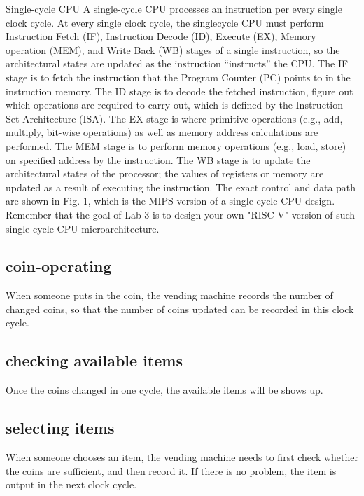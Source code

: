 \documentclass[12pt,a4paper]{article}
\begin{document}
Single-cycle CPU 
A single-cycle CPU processes an instruction per every single clock cycle. 
At every single clock cycle, the singlecycle CPU must perform Instruction Fetch (IF), Instruction Decode (ID), Execute (EX), Memory operation (MEM), and Write Back (WB) stages of a single instruction, so the architectural states are updated as the instruction “instructs” the CPU. 
The IF stage is to fetch the instruction that the Program Counter (PC) points to in the instruction memory. 
The ID stage is to decode the fetched instruction, figure out which operations are required to carry out, which is defined by the Instruction Set Architecture (ISA). 
The EX stage is where primitive operations (e.g., add, multiply, bit-wise operations) as well as memory address calculations are performed. 
The MEM stage is to perform memory operations (e.g., load, store) on specified address by the instruction. 
The WB stage is to update the architectural states of the processor; the values of registers or memory are updated as a result of executing the instruction. 
The exact control and data path are shown in Fig. 1, which is the MIPS version of a single cycle CPU design. 
Remember that the goal of Lab 3 is to design your own "RISC-V" version of such single cycle CPU microarchitecture. 





\subsection{coin-operating}

When someone puts in the coin, the vending machine records the number of changed coins, so that the number of coins updated can be recorded in this clock cycle.

\subsection{checking available items}

Once the coins changed in one cycle, the available items will be shows up.

\subsection{selecting items}

When someone chooses an item, the vending machine needs to first check whether the coins are sufficient, and then record it. 
If there is no problem, the item is output in the next clock cycle.
\end{document}
